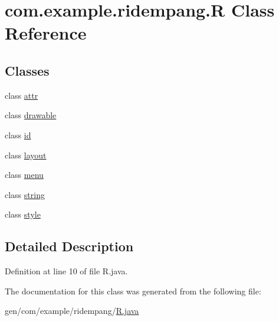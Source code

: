 \hypertarget{classcom_1_1example_1_1ridempang_1_1_r}{\section{com.\-example.\-ridempang.\-R Class Reference}
\label{classcom_1_1example_1_1ridempang_1_1_r}
}
\subsection*{Classes}
\begin{DoxyCompactItemize}
\item 
class \hyperlink{classcom_1_1example_1_1ridempang_1_1_r_1_1attr}{attr}
\item 
class \hyperlink{classcom_1_1example_1_1ridempang_1_1_r_1_1drawable}{drawable}
\item 
class \hyperlink{classcom_1_1example_1_1ridempang_1_1_r_1_1id}{id}
\item 
class \hyperlink{classcom_1_1example_1_1ridempang_1_1_r_1_1layout}{layout}
\item 
class \hyperlink{classcom_1_1example_1_1ridempang_1_1_r_1_1menu}{menu}
\item 
class \hyperlink{classcom_1_1example_1_1ridempang_1_1_r_1_1string}{string}
\item 
class \hyperlink{classcom_1_1example_1_1ridempang_1_1_r_1_1style}{style}
\end{DoxyCompactItemize}


\subsection{Detailed Description}


Definition at line 10 of file R.\-java.



The documentation for this class was generated from the following file\-:\begin{DoxyCompactItemize}
\item 
gen/com/example/ridempang/\hyperlink{_r_8java}{R.\-java}\end{DoxyCompactItemize}
